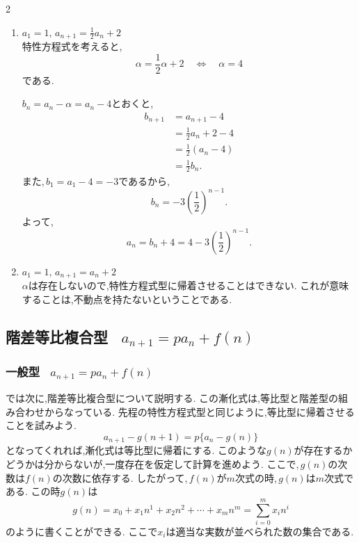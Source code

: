\documentclass[dvipdfmx,a4paper,11pt,fleqn,openany]{jsbook}
\begin{document}
\begin{multicols*}{2}
\begin{enumerate}[label=(\arabic*),parsep=3pt]
          $b_n=a_n-\alpha=a_n+1$とおくと,
          \begin{align*}
            b_{n+1}
              &=a_{n+1}+1\\
              &=2a_n+2\\
              &=2(a_n+1)\\
              &=2b_n.
          \end{align*}
          また,\,$b_1=a_1+1=2$であるから,
          \[
            b_n=2^n.
          \]
          よって,
          \[
            a_n=b_n-1=2^n-1.
          \]

    \item $\displaystyle a_1=1,\,a_{n+1}=\frac12a_n+2$\\
            特性方程式を考えると,
            \[
              \alpha=\frac12\alpha+2
              \quad\Longleftrightarrow\quad
              \alpha=4
            \]
            である.

            $b_n=a_n-\alpha=a_n-4$とおくと,
            \begin{align*}
              b_{n+1}
                &=a_{n+1}-4\\
                &=\frac12a_n+2-4\\
                &=\frac12(a_n-4)\\
                &=\frac12b_n.
            \end{align*}
            また,\,$b_1=a_1-4=-3$であるから,
            \[
              b_n=-3\left(\frac12\right)^{n-1}.
            \]
            よって,
            \[
              a_n=b_n+4
              =4-3\left(\frac12\right)^{n-1}.
            \]
     \item $\displaystyle a_1=1,\, a_{n+1}=a_n+2$\\
           $\alpha$は存在しないので,特性方程式型に帰着させることはできない.
           これが意味することは,不動点を持たないということである.
  \end{enumerate}

  \subsection{階差等比複合型 \, $\displaystyle a_{n+1}=pa_n+f(n)$}
    \subsubsection{一般型 \, $\displaystyle a_{n+1}=pa_n+f(n)$}
      では次に,階差等比複合型について説明する.
      この漸化式は,等比型と階差型の組み合わせからなっている.
      先程の特性方程式型と同じように,等比型に帰着させることを試みよう.
      \[
        a_{n+1}-g(n+1)=p\{a_n-g(n)\}
      \]
      となってくれれば,漸化式は等比型に帰着にする.
      このような$g(n)$が存在するかどうかは分からないが,一度存在を仮定して計算を進めよう.
      ここで,\,$g(n)$の次数は$f(n)$の次数に依存する.
      したがって,\,$f(n)$が$m$次式の時,\,$g(n)$は$m$次式である.
      この時$g(n)$は
      \[
        g(n) = x_0 + x_1 n^1 + x_2 n^2  + \cdots +x_{m} n^m =\sum_{i=0}^{m} x_i n^{i}
      \]
      のように書くことができる.
      ここで$x_i$は適当な実数が並べられた数の集合である.


\end{multicols*}
\end{document}
